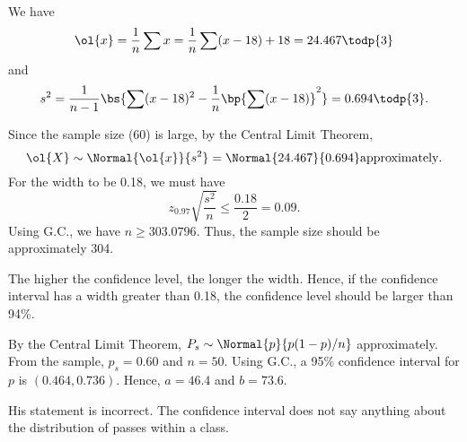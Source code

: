 \begin{solution}
    \begin{ppart}
        \begin{psubpart}
            We have \[\ol{x} = \frac1n \sum x = \frac{1}{n} \sum (x-18) + 18 = 24.467 \todp{3}\] and \[s^2 = \frac1{n-1} \bs{\sum (x - 18)^2 - \frac1n \bp{\sum (x-18)}^2} = 0.694 \todp{3}.\]
        \end{psubpart}
        \begin{psubpart}
            Since the sample size (60) is large, by the Central Limit Theorem, \[\ol{X} \sim \Normal{\ol{x}}{s^2} = \Normal{24.467}{0.694} \text{approximately}.\] For the width to be 0.18, we must have \[z_{0.97} \sqrt{\frac{s^2}{n}} \leq \frac{0.18}{2} = 0.09.\] Using G.C., we have $n \geq 303.0796$. Thus, the sample size should be approximately 304.
        \end{psubpart}
        \begin{psubpart}
            The higher the confidence level, the longer the width. Hence, if the confidence interval has a width greater than 0.18, the confidence level should be larger than 94\%.
        \end{psubpart}
    \end{ppart}
    \begin{ppart}
        By the Central Limit Theorem, $P_s \sim \Normal{p}{p(1-p)/n}$ approximately. From the sample, $p_s = 0.60$ and $n = 50$. Using G.C., a 95\% confidence interval for $p$ is $(0.464, 0.736)$. Hence, $a = 46.4$ and $b = 73.6$.

        His statement is incorrect. The confidence interval does not say anything about the distribution of passes within a class.
    \end{ppart}
\end{solution}